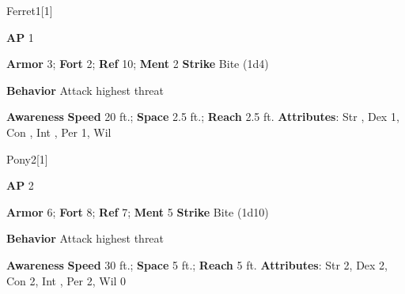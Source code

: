 \begin{monsection}{Ferret}{1}[1]
\vspace{-1em}\vspace{-1em}
\begin{spellcontent}
\begin{spelltargetinginfo}
{\textbf{AP} 1}

\pari \textbf{Armor} 3;
\textbf{Fort} 2;
\textbf{Ref} 10;
\textbf{Ment} 2
\pari \textbf{Strike} Bite  (1d4)



\pari \textbf{Behavior} Attack highest threat
\end{spelltargetinginfo}
\end{spellcontent}

\begin{monsterfooter}
\pari \textbf{Awareness} 
\pari \textbf{Speed} 20 ft.;
\textbf{Space} 2.5 ft.;
\textbf{Reach} 2.5 ft.
\pari \textbf{Attributes}:
Str ,
Dex 1,
Con ,
Int ,
Per 1,
Wil 
\end{monsterfooter}
\end{monsection}





\begin{monsection}{Pony}{2}[1]
\vspace{-1em}\vspace{-1em}
\begin{spellcontent}
\begin{spelltargetinginfo}
{\textbf{AP} 2}

\pari \textbf{Armor} 6;
\textbf{Fort} 8;
\textbf{Ref} 7;
\textbf{Ment} 5
\pari \textbf{Strike} Bite  (1d10)



\pari \textbf{Behavior} Attack highest threat
\end{spelltargetinginfo}
\end{spellcontent}

\begin{monsterfooter}
\pari \textbf{Awareness} 
\pari \textbf{Speed} 30 ft.;
\textbf{Space} 5 ft.;
\textbf{Reach} 5 ft.
\pari \textbf{Attributes}:
Str 2,
Dex 2,
Con 2,
Int ,
Per 2,
Wil 0
\end{monsterfooter}
\end{monsection}





